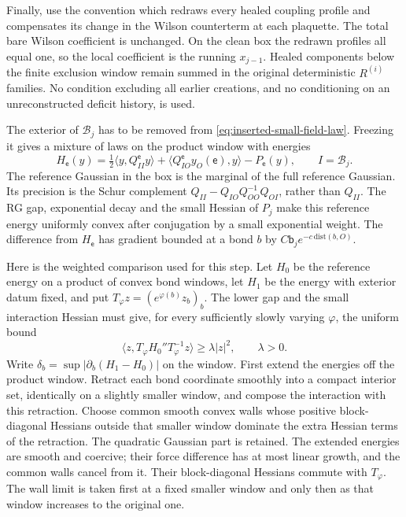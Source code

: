 \documentclass[11pt,letterpaper,reqno]{amsart}
\theoremstyle{definition}
\theoremstyle{remark}
\begin{document}
Finally, use the convention which redraws every healed coupling
profile and compensates its change in the Wilson counterterm at
each plaquette. The total bare Wilson coefficient is unchanged.
On the clean box the redrawn profiles all equal one, so the local
coefficient is the running $x_{j-1}$. Healed components below the
finite exclusion window remain summed in the original deterministic
$R^{(i)}$ families. No condition excluding all earlier creations,
and no conditioning on an unreconstructed deficit history, is used.

The exterior of $\mathcal B_j$ has to be removed from
\eqref{eq:inserted-small-field-law}. Freezing it gives a mixture of
laws on the product window with energies
\[
 H_{\mathsf e}(y)=\tfrac12\langle y,Q^{\mathsf e}_{II}y\rangle
       +\langle Q^{\mathsf e}_{IO}y_O(\mathsf e),y\rangle
       -P_{\mathsf e}(y),\qquad I=\mathcal B_j.
\]
The reference Gaussian in the box is the marginal of the full
reference Gaussian. Its precision is the Schur complement
$Q_{II}-Q_{IO}Q_{OO}^{-1}Q_{OI}$, rather than $Q_{II}$.
The RG gap, exponential decay and the small Hessian of $P_j$ make
this reference energy uniformly convex after conjugation by a small
exponential weight. The difference from $H_{\mathsf e}$ has gradient
bounded at a bond $b$ by
$C\mathsf b_j e^{-c\,\mathrm{dist}(b,O)}$.

Here is the weighted comparison used for this step. Let $H_0$ be
the reference energy on a product of convex bond windows, let $H_1$
be the energy with exterior datum fixed, and put
$T_\varphi z=(e^{\varphi(b)}z_b)_b$. The lower gap and the small
interaction Hessian must give, for every sufficiently slowly varying
$\varphi$, the uniform bound
\[
 \langle z,T_\varphi H_0''T_\varphi^{-1}z\rangle
                                      \ge\lambda|z|^2,
 \qquad\lambda>0.
\]
Write $\delta_b=\sup|\partial_b(H_1-H_0)|$ on the window.
First extend the energies off the product window. Retract each bond
coordinate smoothly into a compact interior set, identically on a
slightly smaller window, and compose the interaction with this
retraction. Choose common smooth convex walls whose positive
block-diagonal Hessians outside that smaller window dominate the
extra Hessian terms of the retraction. The quadratic Gaussian part is
retained. The extended energies are smooth and coercive; their force
difference has at most linear growth, and the common walls cancel
from it. Their block-diagonal Hessians commute with $T_\varphi$.
The wall limit is taken first at a fixed smaller window and only
then as that window increases to the original one.
\end{document}
